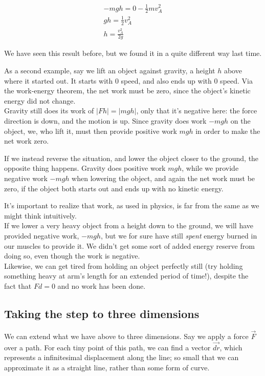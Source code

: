 \documentclass[12pt,a4paper]{report}
\begin{document}
\begin{align}
- m g h = 0 - \frac{1}{2} m v_A^2\\
g h = \frac{1}{2} v_A^2\\
h = \frac{v_A^2}{2 g}
\end{align}

We have seen this result before, but we found it in a quite different way last time.

As a second example, say we lift an object against gravity, a height $h$ above where it started out. It starts with 0 speed, and also ends up with 0 speed. Via the work-energy theorem, the net work must be zero, since the object's kinetic energy did not change.\\
Gravity still does its work of $|F h| = |m g h|$, only that it's negative here: the force direction is down, and the motion is up. Since gravity does work $- m g h$ on the object, we, who lift it, must then provide positive work $m g h$ in order to make the net work zero.

If we instead reverse the situation, and lower the object closer to the ground, the opposite thing happens. Gravity does positive work $m g h$, while we provide negative work $- m g h$ when lowering the object, and again the net work must be zero, if the object both starts out and ends up with no kinetic energy.

It's important to realize that work, as used in physics, is far from the same as we might think intuitively.\\
If we lower a very heavy object from a height down to the ground, we will have provided negative work, $- m g h$, but we for sure have still \emph{spent} energy burned in our muscles to provide it. We didn't get some sort of added energy reserve from doing so, even though the work is negative.\\
Likewise, we can get tired from holding an object perfectly still (try holding something heavy at arm's length for an extended period of time!), despite the fact that $F d = 0$ and no work has been done.

\subsection{Taking the step to three dimensions}

We can extend what we have above to three dimensions. Say we apply a force $\vec{F}$ over a path. For each tiny point of this path, we can find a vector $\vec{dr}$, which represents a infinitesimal displacement along the line; so small that we can approximate it as a straight line, rather than some form of curve.
\end{document}
